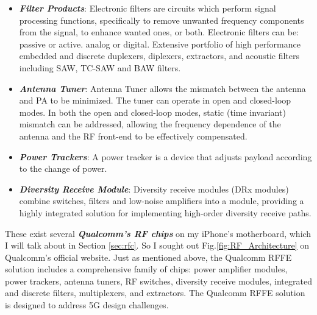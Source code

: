 \documentclass[conference]{IEEEtran}
\begin{document}
\begin{itemize}
	\item {\bfseries{\emph{Filter Products}}}: Electronic filters are circuits which perform signal processing functions, specifically to remove unwanted frequency components from the signal, to enhance wanted ones, or both. Electronic filters can be: passive or active. analog or digital\cite{Electronic_filter.org}. Extensive portfolio of high performance embedded and discrete duplexers, diplexers, extractors, and acoustic filters including SAW, TC-SAW and BAW filters\cite{Qualcomm.org}.
		
	\item {\bfseries{\emph{Antenna Tuner}}}: Antenna Tuner allows the mismatch between the antenna and PA to be minimized. The tuner can operate in open and closed-loop modes. In both the open and closed-loop modes, static (time invariant) mismatch can be addressed, allowing the frequency dependence of the antenna and the RF front-end to be effectively compensated\cite{6546299}.
	
	\item {\bfseries{\emph{Power Trackers}}}: A power tracker is a device that adjusts payload according to the change of power.
	
	\item {\bfseries{\emph{Diversity Receive Module}}}: Diversity receive modules (DRx modules) combine switches, filters and low-noise amplifiers into a module, providing a highly integrated solution for implementing high-order diversity receive paths\cite{Qualcomm.org}.
\end{itemize}

These exist several {\bfseries{\emph{Qualcomm's RF chips}}} on my iPhone's motherboard, which I will talk about in Section \ref{sec:rfc}. So I sought out Fig.\ref{fig:RF_Architecture} on Qualcomm's official website. Just as mentioned above, the Qualcomm RFFE solution includes a comprehensive family of chips: power amplifier modules, power trackers, antenna tuners, RF switches, diversity receive modules, integrated and discrete filters, multiplexers, and extractors. The Qualcomm RFFE solution is designed to address 5G design challenges. 
\end{document}

